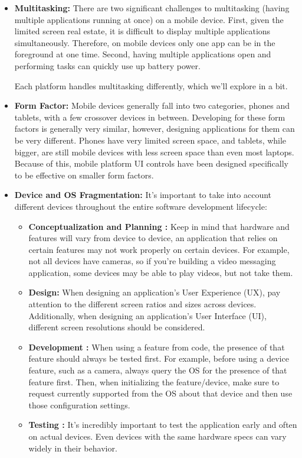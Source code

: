 \begin{itemize}

\item \textbf{Multitasking: }
There are two significant challenges to multitasking (having multiple applications running at once) on a mobile device. First, given the limited screen real estate, it is difficult to display multiple applications simultaneously. Therefore, on mobile devices only one app can be in the foreground at one time. Second, having multiple applications open and performing tasks can quickly use up battery power.

Each platform handles multitasking differently, which we’ll explore in a bit.


\item \textbf{Form Factor: }
Mobile devices generally fall into two categories, phones and tablets, with a few crossover devices in between. Developing for these form factors is generally very similar, however, designing applications for them can be very different. Phones have very limited screen space, and tablets, while bigger, are still mobile devices with less screen space than even most laptops. Because of this, mobile platform UI controls have been designed specifically to be effective on smaller form factors.


\item \textbf{ Device and OS Fragmentation: }
It’s important to take into account different devices throughout the entire software development lifecycle:

\begin{itemize}

\item \textbf{Conceptualization and Planning : } Keep in mind that hardware and features will vary from device to device, an application that relies on certain features may not work properly on certain devices. For example, not all devices have cameras, so if you’re building a video messaging application, some devices may be able to play videos, but not take them.
\item \textbf{Design: }  When designing an application’s User Experience (UX), pay attention to the different screen ratios and sizes across devices. Additionally, when designing an application’s User Interface (UI), different screen resolutions should be considered.
\item \textbf{Development : }When using a feature from code, the presence of that feature should always be tested first. For example, before using a device feature, such as a camera, always query the OS for the presence of that feature first. Then, when initializing the feature/device, make sure to request currently supported from the OS about that device and then use those configuration settings.
\item \textbf{Testing : } It’s incredibly important to test the application early and often on actual devices. Even devices with the same hardware specs can vary widely in their behavior.
\end{itemize}




\end{itemize}
